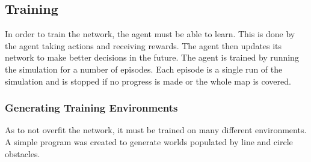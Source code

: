 
\subsection{Training}
In order to train the network, the agent must be able to learn. This is done by the agent taking actions and receiving rewards. The agent then updates its network to make better decisions in the future. The agent is trained by running the simulation for a number of episodes. 
Each episode is a single run of the simulation and is stopped if no progress is made or the whole map is covered.

\subsubsection{Generating Training Environments}
As to not overfit the network, it must be trained on many different environments. A simple program was created to generate worlds populated by line and circle obstacles.

